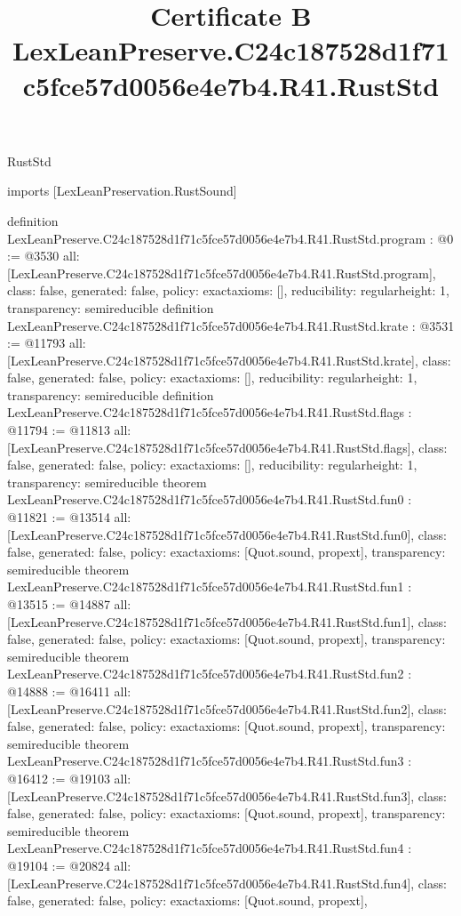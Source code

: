 \begin{lexlean}{RustStd}
\title{Certificate B LexLeanPreserve.C24c187528d1f71c5fce57d0056e4e7b4.R41.RustStd}
\begin{coremodule}
imports [LexLeanPreservation.RustSound]

definition LexLeanPreserve.C24c187528d1f71c5fce57d0056e4e7b4.R41.RustStd.program : @0 := @3530 {
  all: [LexLeanPreserve.C24c187528d1f71c5fce57d0056e4e7b4.R41.RustStd.program],
  class: false,
  generated: false,
  policy: exact{axioms: []},
  reducibility: regular{height: 1},
  transparency: semireducible
}
definition LexLeanPreserve.C24c187528d1f71c5fce57d0056e4e7b4.R41.RustStd.krate : @3531 := @11793 {
  all: [LexLeanPreserve.C24c187528d1f71c5fce57d0056e4e7b4.R41.RustStd.krate],
  class: false,
  generated: false,
  policy: exact{axioms: []},
  reducibility: regular{height: 1},
  transparency: semireducible
}
definition LexLeanPreserve.C24c187528d1f71c5fce57d0056e4e7b4.R41.RustStd.flags : @11794 := @11813 {
  all: [LexLeanPreserve.C24c187528d1f71c5fce57d0056e4e7b4.R41.RustStd.flags],
  class: false,
  generated: false,
  policy: exact{axioms: []},
  reducibility: regular{height: 1},
  transparency: semireducible
}
theorem LexLeanPreserve.C24c187528d1f71c5fce57d0056e4e7b4.R41.RustStd.fun0 : @11821 := @13514 {
  all: [LexLeanPreserve.C24c187528d1f71c5fce57d0056e4e7b4.R41.RustStd.fun0],
  class: false,
  generated: false,
  policy: exact{axioms: [Quot.sound, propext]},
  transparency: semireducible
}
theorem LexLeanPreserve.C24c187528d1f71c5fce57d0056e4e7b4.R41.RustStd.fun1 : @13515 := @14887 {
  all: [LexLeanPreserve.C24c187528d1f71c5fce57d0056e4e7b4.R41.RustStd.fun1],
  class: false,
  generated: false,
  policy: exact{axioms: [Quot.sound, propext]},
  transparency: semireducible
}
theorem LexLeanPreserve.C24c187528d1f71c5fce57d0056e4e7b4.R41.RustStd.fun2 : @14888 := @16411 {
  all: [LexLeanPreserve.C24c187528d1f71c5fce57d0056e4e7b4.R41.RustStd.fun2],
  class: false,
  generated: false,
  policy: exact{axioms: [Quot.sound, propext]},
  transparency: semireducible
}
theorem LexLeanPreserve.C24c187528d1f71c5fce57d0056e4e7b4.R41.RustStd.fun3 : @16412 := @19103 {
  all: [LexLeanPreserve.C24c187528d1f71c5fce57d0056e4e7b4.R41.RustStd.fun3],
  class: false,
  generated: false,
  policy: exact{axioms: [Quot.sound, propext]},
  transparency: semireducible
}
theorem LexLeanPreserve.C24c187528d1f71c5fce57d0056e4e7b4.R41.RustStd.fun4 : @19104 := @20824 {
  all: [LexLeanPreserve.C24c187528d1f71c5fce57d0056e4e7b4.R41.RustStd.fun4],
  class: false,
  generated: false,
  policy: exact{axioms: [Quot.sound, propext]},
}
\end{coremodule}
\end{lexlean}
